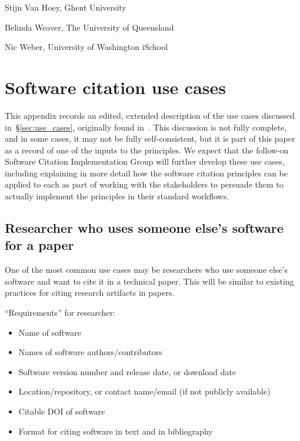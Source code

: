\documentclass[12pt, oneside]{amsart}
\begin{document}
Stijn Van Hoey, Ghent University

Belinda Weaver, The University of Queensland

Nic Weber, University of Washington iSchool

\section{Software citation use cases}
\label{app:usecases}

This appendix records an edited, extended description of the use cases
discussed in~\S\ref{sec:use_cases}, originally found in~\cite{SC-Use-Cases}.
This discussion is not fully complete, and in some cases, it may not be fully
self-consistent, but it is part of this paper as a record of one of the inputs
to the principles. We expect that the follow-on Software Citation
Implementation Group will further develop these use cases, including explaining
in more detail how the software citation principles can be applied
to each as part of working with the stakeholders to persuade them to actually
implement the principles in their standard workflows.


\subsection{Researcher who uses someone else's software for a paper}

One of the most common use cases may be researchers who use someone else's software and want to cite it in a technical paper.
This will be similar to existing practices for citing research artifacts in papers.

``Requirements'' for researcher:
\begin{itemize}
\item Name of software
\item Names of software authors/contributors
\item Software version number and release date, or download date
\item Location/repository, or contact name/email (if not publicly available)
\item Citable DOI of software
\item Format for citing software in text and in bibliography
\end{itemize}
\end{document}
